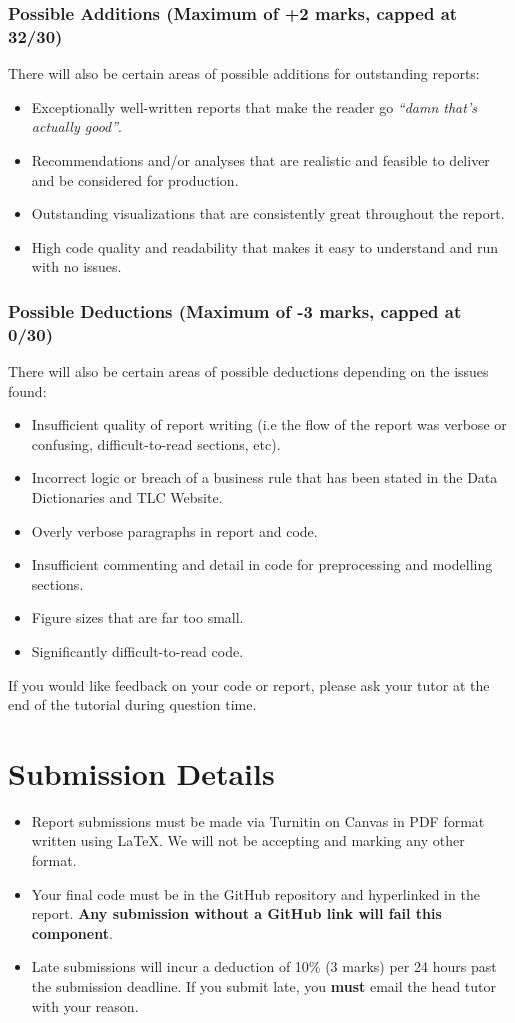 \documentclass[12pt]{article}
\begin{document}
\subsubsection*{Possible Additions (Maximum of +2 marks, capped at 32/30)}
There will also be certain areas of possible additions for outstanding reports:
\begin{itemize}
    \item Exceptionally well-written reports that make the reader go \textit{``damn that's actually good''}.
    \item Recommendations and/or analyses that are realistic and feasible to deliver and be considered for production.
    \item Outstanding visualizations that are consistently great throughout the report.
    \item High code quality and readability that makes it easy to understand and run with no issues.
\end{itemize}

\subsubsection*{Possible Deductions (Maximum of -3 marks, capped at 0/30)}
There will also be certain areas of possible deductions depending on the issues found:
\begin{itemize}
    \item Insufficient quality of report writing (i.e the flow of the report was verbose or confusing, difficult-to-read sections, etc).
    \item Incorrect logic or breach of a business rule that has been stated in the Data Dictionaries and TLC Website.
    \item Overly verbose paragraphs in report and code.
    \item Insufficient commenting and detail in code for preprocessing and modelling sections.
    \item Figure sizes that are far too small.
    \item Significantly difficult-to-read code.
\end{itemize}
If you would like feedback on your code or report, please ask your tutor at the end of the tutorial during question time.

\section*{Submission Details}
\begin{itemize}
    \item Report submissions must be made via Turnitin on Canvas in PDF format written using LaTeX. We will not be accepting and marking any other format.
    \item Your final code must be in the GitHub repository and hyperlinked in the report. \textbf{Any submission without a GitHub link will fail this component}. 
    \item Late submissions will incur a deduction of 10\% (3 marks) per 24 hours past the submission deadline. If you submit late, you \textbf{must} email the head tutor with your reason.
\end{itemize}
\end{document}
